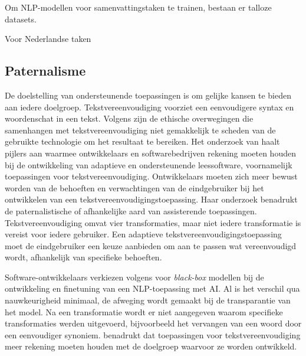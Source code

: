 Om NLP-modellen voor samenvattingstaken te trainen, bestaan er talloze datasets. 

Voor Nederlandse taken 







\subsection{Paternalisme}

De doelstelling van ondersteunende toepassingen is om gelijke kansen te bieden aan iedere doelgroep. Tekstvereenvoudiging voorziet een eenvoudigere syntax en woordenschat in een tekst. Volgens \textcite{Niemeijer2010} zijn de ethische overwegingen die samenhangen met tekstvereenvoudiging niet gemakkelijk te scheden van de gebruikte technologie om het resultaat te bereiken. Het onderzoek van \textcite{Gooding2022} haalt pijlers aan waarmee ontwikkelaars en softwarebedrijven rekening moeten houden bij de ontwikkeling van adaptieve en ondersteunende leessoftware, voornamelijk toepassingen voor tekstvereenvoudiging. Ontwikkelaars moeten zich meer bewust worden van de behoeften en verwachtingen van de eindgebruiker bij het ontwikkelen van een tekstvereenvoudigingstoepassing. Haar onderzoek benadrukt de paternalistische of afhankelijke aard van assisterende toepassingen. Tekstvereenvoudiging omvat vier transformaties, maar niet iedere transformatie is vereist voor iedere gebruiker. Een adaptieve tekstvereenvoudigingstoepassing moet de eindgebruiker een keuze aanbieden om aan te passen wat vereenvoudigd wordt, afhankelijk van specifieke behoeften.


Software-ontwikkelaars verkiezen volgens \textcite{Punardeep2020} voor \textit{black-box} modellen bij de ontwikkeling en finetuning van een NLP-toepassing met AI. Al is het verschil qua nauwkeurigheid minimaal, de afweging wordt gemaakt bij de transparantie van het model. Na een transformatie wordt er niet aangegeven waarom specifieke transformaties werden uitgevoerd, bijvoorbeeld het vervangen van een woord door een eenvoudiger synoniem. \textcite{Xu2015} benadrukt dat toepassingen voor tekstvereenvoudiging meer rekening moeten houden met de doelgroep waarvoor ze worden ontwikkeld.

